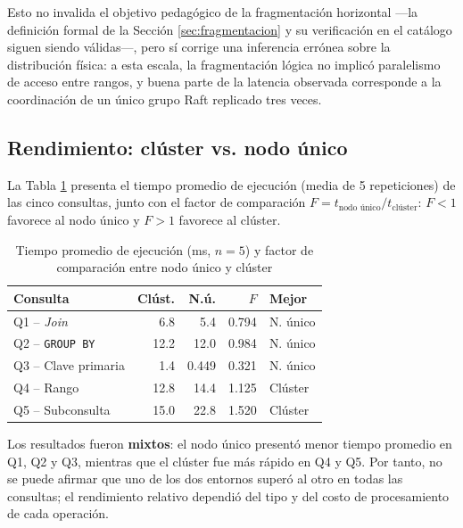 \documentclass[10pt,letterpaper]{article}
\begin{document}
Esto no invalida el objetivo pedagógico de la fragmentación horizontal —la definición formal de la Sección \ref{sec:fragmentacion} y su verificación en el catálogo siguen siendo válidas—, pero sí corrige una inferencia errónea sobre la distribución física: a esta escala, la fragmentación lógica no implicó paralelismo de acceso entre rangos, y buena parte de la latencia observada corresponde a la coordinación de un único grupo Raft replicado tres veces.

\subsection{Rendimiento: clúster vs. nodo único}
La Tabla \ref{tab:resultados} presenta el tiempo promedio de ejecución (media de 5 repeticiones) de las cinco consultas, junto con el factor de comparación $F = t_{\text{nodo único}} / t_{\text{clúster}}$: $F<1$ favorece al nodo único y $F>1$ favorece al clúster.

\begin{table}[H]
\centering
\caption{Tiempo promedio de ejecución (ms, $n=5$) y factor de comparación entre nodo único y clúster}
\label{tab:resultados}
\begin{tabularx}{\columnwidth}{Xrrrl}
\toprule
{\small\textbf{Consulta}} & {\small\textbf{Clúst.}} & {\small\textbf{N.ú.}} & {\small\textbf{$F$}} & {\small\textbf{Mejor}}\\
\midrule
{\small Q1 -- \textit{Join}}          & {\small 6.8}  & {\small 5.4}  & {\small 0.794} & {\small N. único}\\
{\small Q2 -- \texttt{GROUP BY}}      & {\small 12.2} & {\small 12.0} & {\small 0.984} & {\small N. único}\\
{\small Q3 -- Clave primaria}         & {\small 1.4}  & {\small 0.449}& {\small 0.321} & {\small N. único}\\
{\small Q4 -- Rango}                  & {\small 12.8} & {\small 14.4} & {\small 1.125} & {\small Clúster}\\
{\small Q5 -- Subconsulta}            & {\small 15.0} & {\small 22.8} & {\small 1.520} & {\small Clúster}\\
\bottomrule
\end{tabularx}
\end{table}

Los resultados fueron \textbf{mixtos}: el nodo único presentó menor tiempo promedio en Q1, Q2 y Q3, mientras que el clúster fue más rápido en Q4 y Q5. Por tanto, no se puede afirmar que uno de los dos entornos superó al otro en todas las consultas; el rendimiento relativo dependió del tipo y del costo de procesamiento de cada operación.
\end{document}

